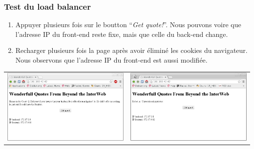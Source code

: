 \documentclass[a4paper,11pt,titlepage]{article}
\begin{document}
\subsubsection{Test du load balancer}
\begin{enumerate}
	\item Appuyer plusieurs fois sur le boutton ``\emph{Get quote!}''. Nous pouvons voire que l'adresse IP du front-end reste fixe, mais que celle du back-end change.
	\item Recharger plusieurs fois la page après avoir éliminé les cookies du navigateur. Nous observons que l'adresse IP du front-end est aussi modifiée.
\end{enumerate}
\begin{center}
\begin{tabular}{cc}
	\includegraphics[scale=0.3]{test2.png} & \includegraphics[scale=0.3]{test3.png} \\

\end{tabular}
\end{center}
\end{document}
